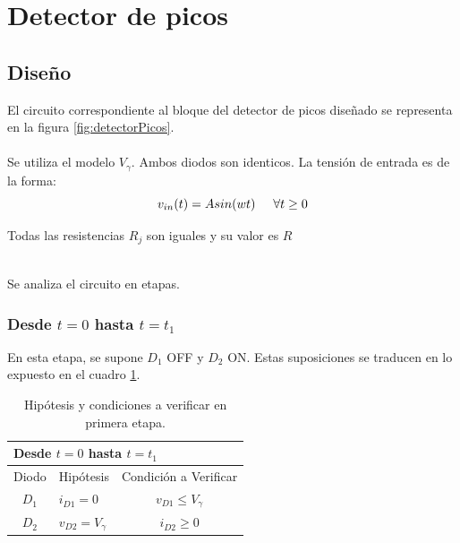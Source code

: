 \section{Detector de picos}
\subsection{Diseño}
 El circuito correspondiente al bloque del detector de picos diseñado se representa en la figura \ref{fig:detectorPicos}. \\\\
 
 
 Se utiliza el modelo $V_{\gamma}$. Ambos diodos son identicos. 
 La tensión de entrada es de la forma:
 \begin{equation*}
 		v_{in}(t) = Asin(wt) \hspace{0.5cm} \forall t\geq 0
 \end{equation*}
 
 Todas las resistencias $R_j$ son iguales y su valor es $R$

\\
Se analiza el circuito en etapas.
\subsubsection{Desde $t=0$ hasta $t=t_1$}
En esta etapa, se supone $D_1$ OFF y $D_2$ ON. Estas suposiciones se traducen en lo expuesto en el cuadro \ref{cuadro:DP1eraEtapa}.


\begin{table}[!htb]
	\centering
	\caption{Hipótesis y condiciones a verificar en primera etapa.}
	\label{cuadro:DP1eraEtapa}
	\begin{tabular}{lll}
		\multicolumn{3}{l}{Desde $t=0$ hasta $t=t_1$}                                                                      \\ \hline
		\multicolumn{1}{|l|}{Diodo} & \multicolumn{1}{l|}{Hipótesis}          & \multicolumn{1}{c|}{Condición a Verificar}             \\ \hline
		\multicolumn{1}{|c|}{$D_1$} & \multicolumn{1}{l|}{$i_{D1}=0$}         & \multicolumn{1}{c|}{$v_{D1}\leq V_\gamma$} \\ \hline
		\multicolumn{1}{|c|}{$D_2$} & \multicolumn{1}{l|}{$v_{D2}= V_\gamma$} & \multicolumn{1}{c|}{$i_{D2}\geq 0$}        \\ \hline
	\end{tabular}
\end{table}

